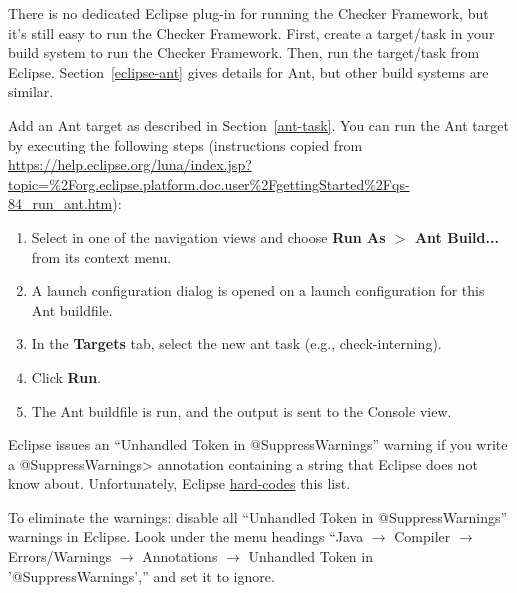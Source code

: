 There is no dedicated Eclipse plug-in for running the Checker Framework,
but it's still easy to run the Checker Framework.  First, create a
target/task in your build system to run the Checker Framework.  Then, run
the target/task from Eclipse.  Section~\ref{eclipse-ant} gives details for
Ant, but other build systems are similar.



Add an Ant target as described in Section~\ref{ant-task}.  You can
run the Ant target by executing the following steps
(instructions copied from
{\codesize\url{https://help.eclipse.org/luna/index.jsp?topic=%2Forg.eclipse.platform.doc.user%2FgettingStarted%2Fqs-84_run_ant.htm}}):

\begin{enumerate}

\item
  Select  in one of the navigation views and choose
  {\bf Run As $>$ Ant Build...} from its context menu.

\item
  A launch configuration dialog is opened on a launch configuration
  for this Ant buildfile.

\item
  In the {\bf Targets} tab, select the new ant task (e.g., check-interning).

\item
  Click {\bf Run}.

\item
  The Ant buildfile is run, and the output is sent to the Console view.

\end{enumerate}



Eclipse issues an ``Unhandled Token in @SuppressWarnings'' warning if you
write a \<@SuppressWarnings> annotation containing a string that Eclipse does not
know about.  Unfortunately, Eclipse
\href{https://bugs.eclipse.org/bugs/show_bug.cgi?id=122475}{hard-codes}
this list.

To eliminate the warnings:
disable all ``Unhandled Token in @SuppressWarnings'' warnings in Eclipse.
Look under the menu headings
``Java $\rightarrow$ Compiler $\rightarrow$ Errors/Warnings $\rightarrow$
Annotations $\rightarrow$ Unhandled Token in '@SuppressWarnings',''
and set it to ignore.



